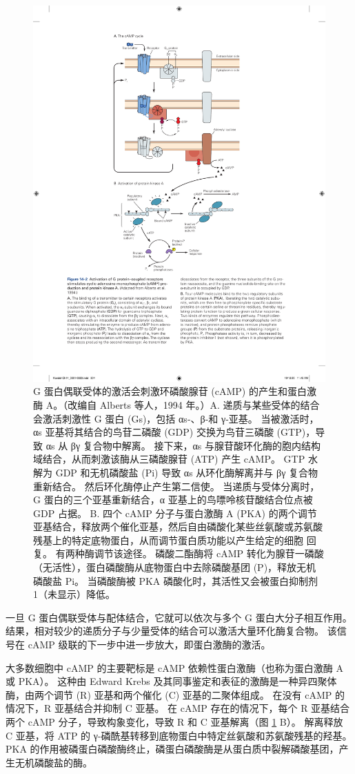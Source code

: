 \begin{figure}[htbp]
	\centering
	\includegraphics[width=0.65\linewidth]{chap14/fig_14_2}
	\caption{G 蛋白偶联受体的激活会刺激环磷酸腺苷 (cAMP) 的产生和蛋白激酶 A。（改编自 Alberts 等人，1994 年。）A. 递质与某些受体的结合会激活刺激性 G 蛋白 (Gs)，包括 αs-、β-和 γ-亚基。 当被激活时，αs 亚基将其结合的鸟苷二磷酸 (GDP) 交换为鸟苷三磷酸 (GTP)，导致 αs 从 βγ 复合物中解离。 接下来，αs 与腺苷酸环化酶的胞内结构域结合，从而刺激该酶从三磷酸腺苷 (ATP) 产生 cAMP。 GTP 水解为 GDP 和无机磷酸盐 (Pi) 导致 αs 从环化酶解离并与 βγ 复合物重新结合。 然后环化酶停止产生第二信使。 当递质与受体分离时，G 蛋白的三个亚基重新结合，α 亚基上的鸟嘌呤核苷酸结合位点被 GDP 占据。 B. 四个 cAMP 分子与蛋白激酶 A (PKA) 的两个调节亚基结合，释放两个催化亚基，然后自由磷酸化某些丝氨酸或苏氨酸残基上的特定底物蛋白，从而调节蛋白质功能以产生给定的细胞 回复。 有两种酶调节该途径。 磷酸二酯酶将 cAMP 转化为腺苷一磷酸（无活性），蛋白磷酸酶从底物蛋白中去除磷酸基团 (P)，释放无机磷酸盐 Pi。 当磷酸酶被 PKA 磷酸化时，其活性又会被蛋白抑制剂 1（未显示）降低。}
	\label{fig:14_2}
\end{figure}


一旦 G 蛋白偶联受体与配体结合，它就可以依次与多个 G 蛋白大分子相互作用。
结果，相对较少的递质分子与少量受体的结合可以激活大量环化酶复合物。
该信号在 cAMP 级联的下一步中进一步放大，即蛋白激酶的激活。


大多数细胞中 cAMP 的主要靶标是 cAMP 依赖性蛋白激酶（也称为蛋白激酶 A 或 PKA）。
这种由 Edward Krebs 及其同事鉴定和表征的激酶是一种异四聚体酶，由两个调节 (R) 亚基和两个催化 (C) 亚基的二聚体组成。
在没有 cAMP 的情况下，R 亚基结合并抑制 C 亚基。 在 cAMP 存在的情况下，每个 R 亚基结合两个 cAMP 分子，导致构象变化，导致 R 和 C 亚基解离（图 \ref{fig:14_2}  B）。
解离释放 C 亚基，将 ATP 的 γ-磷酰基转移到底物蛋白中特定丝氨酸和苏氨酸残基的羟基。
PKA 的作用被磷蛋白磷酸酶终止，磷蛋白磷酸酶是从蛋白质中裂解磷酸基团，产生无机磷酸盐的酶。


